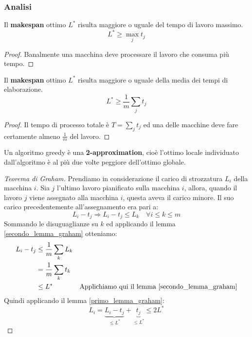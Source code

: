 \documentclass[\main/main.tex]{subfiles}
\begin{document}
\subsubsection{Analisi}
\begin{lemma}
	Il \textbf{makespan} ottimo \(L^*\) risulta maggiore o uguale del tempo di lavoro massimo.
	\[
		L^* \geq \max_{j} t_j
	\]
	\label{primo_lemma_graham}
\end{lemma}
\begin{proof}
	Banalmente una macchina deve processare il lavoro che consuma più tempo.
\end{proof}
\begin{lemma}
	Il  \textbf{makespan} ottimo \(L^*\) risulta maggiore o uguale della media dei tempi di elaborazione.
	\[
		L^* \geq \frac{1}{m} \sum_{j} t_j
	\]
	\label{secondo_lemma_graham}
\end{lemma}
\begin{proof}
	Il tempo di processo totale è \(T = \sum_{j} t_j\) ed una delle macchine deve fare certamente almeno \(\frac{1}{m}\) del lavoro.
\end{proof}
\begin{theorem}
	Un algoritmo greedy è una \textbf{2-approximation}, cioè l'ottimo locale individuato dall'algoritmo è al più due volte peggiore dell'ottimo globale.
	\label{graham_theorem}
\end{theorem}
\begin{proof}[Teorema di Graham]
	Prendiamo in considerazione il carico di strozzatura \(L_i\) della macchina \(i\). Sia \(j\) l'ultimo lavoro pianificato sulla macchina \(i\), allora, quando il lavoro \(j\) viene assegnato alla macchina \(i\), questa aveva il carico minore. Il suo carico precedentemente all'assegnamento era pari a:
	\[
		L_i - t_j \Rightarrow L_i - t_j \leq L_k \quad \forall i \leq k \leq m
	\]
	Sommando le disuguaglianze su \(k\) ed applicando il lemma \ref{secondo_lemma_graham} otteniamo:
	\begin{align*}
		L_i - t_j & \leq \frac{1}{m} \sum_{k} L_k &                                                            \\
		          & = \frac{1}{m} \sum_{k} t_k    &                                                            \\
		          & \leq L^*                      & \text{Applichiamo qui il lemma \ref{secondo_lemma_graham}} \\
	\end{align*}
	Quindi applicando il lemma \ref{primo_lemma_graham}:
	\[
		L_i = \underbrace{L_i - t_j}_{\leq L^*} + \underbrace{t_j}_{\leq L^*} \leq 2L^*
	\]
\end{proof}
\end{document}
